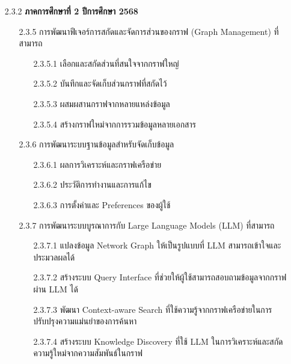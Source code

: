 \documentclass[12pt,a4paper]{article}
\begin{document}
\begin{enumerate}[leftmargin=2cm]
{        \vspace{2cm}

        \begin{enumerate}
            \item[2.3.2] \textbf{ภาคการศึกษาที่ 2 ปีการศึกษา 2568}
            \begin{enumerate}
                \item[2.3.5] การพัฒนาฟีเจอร์การสกัดและจัดการส่วนของกราฟ (Graph Management) ที่สามารถ
                \begin{enumerate}
                    \item[2.3.5.1] เลือกและสกัดส่วนที่สนใจจากกราฟใหญ่
                    \item[2.3.5.2] บันทึกและจัดเก็บส่วนกราฟที่สกัดไว้
                    \item[2.3.5.3] ผสมผสานกราฟจากหลายแหล่งข้อมูล
                    \item[2.3.5.4] สร้างกราฟใหม่จากการรวมข้อมูลหลายเอกสาร
                \end{enumerate}
                \item[2.3.6] การพัฒนาระบบฐานข้อมูลสำหรับจัดเก็บข้อมูล
                \begin{enumerate}
                    \item[2.3.6.1] ผลการวิเคราะห์และกราฟเครือข่าย
                    \item[2.3.6.2] ประวัติการทำงานและการแก้ไข
                    \item[2.3.6.3] การตั้งค่าและ Preferences ของผู้ใช้
                \end{enumerate}
                \item[2.3.7] การพัฒนาระบบบูรณาการกับ Large Language Models (LLM) ที่สามารถ
                \begin{enumerate}
                    \item[2.3.7.1] แปลงข้อมูล Network Graph ให้เป็นรูปแบบที่ LLM สามารถเข้าใจและประมวลผลได้
                    \item[2.3.7.2] สร้างระบบ Query Interface ที่ช่วยให้ผู้ใช้สามารถสอบถามข้อมูลจากกราฟผ่าน LLM ได้
                    \item[2.3.7.3] พัฒนา Context-aware Search ที่ใช้ความรู้จากกราฟเครือข่ายในการปรับปรุงความแม่นยำของการค้นหา
                    \item[2.3.7.4] สร้างระบบ Knowledge Discovery ที่ใช้ LLM ในการวิเคราะห์และสกัดความรู้ใหม่จากความสัมพันธ์ในกราฟ
                \end{enumerate}
            \end{enumerate}
        \end{enumerate}
    }


\end{enumerate}
\end{document}
